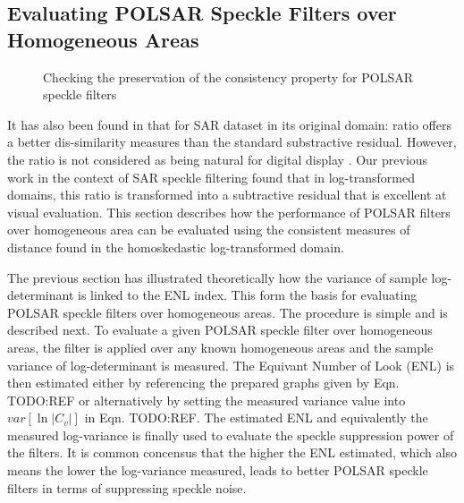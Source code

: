 \subsection{Evaluating POLSAR Speckle Filters over Homogeneous Areas}

\begin{figure}
	\hfill	
  \caption{Checking the preservation of the consistency property for POLSAR speckle filters}  
\end{figure}

It has also been found in \cite{Rignot_1993_TGRS_896} that for SAR dataset in its original domain: 
   ratio offers a better dis-similarity measures than the standard substractive residual. 
However, the ratio is not considered as being natural for digital display \cite{Medeiros_2003_IJRS}.
Our previous work in the context of SAR speckle filtering found that
  in log-transformed domains, this ratio is transformed into a subtractive residual that is excellent at visual evaluation.
This section describes how the performance of POLSAR filters over homogeneous area can be evaluated
  using the consistent measures of distance found in the homoskedastic log-transformed domain.

The previous section has illustrated theoretically how the variance of sample log-determinant is linked to the ENL index.
This form the basis for evaluating POLSAR speckle filters over homogeneous areas.
The procedure is simple and is described next.
To evaluate a given POLSAR speckle filter over homogeneous areas,
  the filter is applied over any known homogeneous areas and the sample variance of log-determinant is measured.
The Equivant Number of Look (ENL) is then estimated
  either by referencing the prepared graphs given by Eqn. TODO:REF
  or alternatively by setting the measured variance value into $var[\ln{|C_v|}]$ in Eqn. TODO:REF.
The estimated ENL and equivalently the measured log-variance is finally used to evaluate the speckle suppression power of the filters.
It is common concensus that the higher the ENL estimated,
  which also means the lower the log-variance measured,
  leads to better POLSAR speckle filters in terms of suppressing speckle noise.
  
